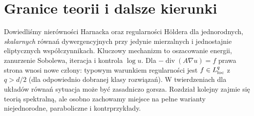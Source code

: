\section{Granice teorii i dalsze kierunki}
\label{sec:pde17-final}
Dowiedliśmy nierówności Harnacka oraz regularności Höldera
dla jednorodnych, \emph{skalarnych} równań dywergencyjnych
przy jedynie mierzalnych i jednostajnie eliptycznych
współczynnikach. Kluczowy mechanizm to oszacowanie energii,
zanurzenie Sobolewa, iteracja i kontrola $\log u$.
Dla $-\operatorname{div}(A\nabla u)=f$ prawa strona wnosi
nowe człony: typowym warunkiem regularności jest
$f\in L^q_{\rm loc}$ z $q>d/2$ (dla odpowiednio dobranej
klasy rozwiązań). W twierdzeniach dla układów równań
sytuacja może być zasadniczo gorsza. Rozdział kolejny
zajmie się teorią spektralną, ale osobno zachowamy miejsce
na pełne warianty niejednorodne, paraboliczne i kontrprzykłady.

